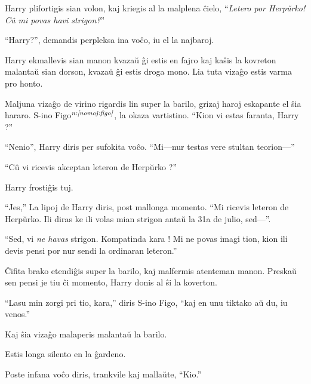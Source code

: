 Harry plifortigis sian volon, kaj kriegis al la malplena ĉielo,
``\emph{Letero por Herpŭrko! Cû mi povas havi strigon?}''

``Harry?'', demandis perpleksa ina voĉo, iu el la najbaroj.

Harry ekmallevis sian manon kvazaŭ ĝi estis en fajro kaj kaŝis la
kovreton malantaŭ sian dorson, kvazaŭ ĝi estis droga mono. Lia tuta
vizaĝo estis varma pro honto.

Maljuna vizaĝo de virino rigardis lin super la barilo, grizaj haroj
eskapante el ŝia hararo. S-ino Figo$^{\textit{n:\ref{nomoj:figo}}}$, la okaza
vartistino. ``Kion vi estas faranta, Harry ?''

``Nenio'', Harry diris per sufokita voĉo. ``Mi—nur testas vere stultan
teorion—''

``Cû vi ricevis akceptan leteron de Herpŭrko ?''

Harry frostiĝis tuj.

``Jes,'' La lipoj de Harry diris, post mallonga momento. ``Mi ricevis
leteron de Herpŭrko. Ili diras ke ili volas mian strigon antaŭ la 31a
de julio, sed—''.

``Sed, vi \emph{ne havas} strigon. Kompatinda kara ! Mi ne povas imagi tion, kion
ili devis pensi por nur sendi la ordinaran leteron.''

Ĉifita brako etendiĝis super la barilo, kaj malfermis atenteman
manon. Preskaŭ sen pensi je tiu ĉi momento, Harry donis al ŝi la koverton.

``Lasu min zorgi pri tio, kara,'' diris S-ino Figo, ``kaj en unu tiktako aŭ du, iu venos.''  

Kaj ŝia vizaĝo malaperis malantaŭ la barilo.

Estis longa silento en la ĝardeno.

Poste infana voĉo diris, trankvile kaj mallaŭte, ``Kio.''
